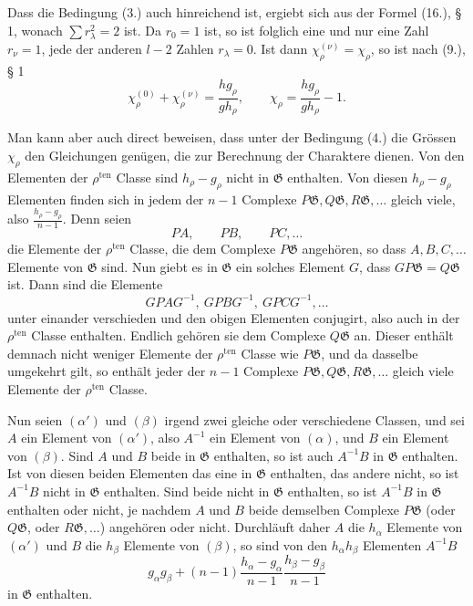 \documentclass[11pt]{article}
\newcommand{\Ggr}{\mathfrak{G}}
\begin{document}
Dass die Bedingung (3.) auch hinreichend ist, ergiebt sich aus der Formel (16.), § 1, wonach $\sum r_\lambda^2=2$ ist. Da $r_0=1$ ist, so ist folglich eine und nur eine Zahl $r_\nu=1$, jede der anderen $l-2$ Zahlen $r_\lambda=0$. Ist dann $\chi_\rho^{(\nu)}=\chi_\rho$, so ist nach (9.), § 1
\[
  \chi_\rho^{(0)}+\chi_\rho^{(\nu)}
  =
  \frac{h g_\rho}{g h_\rho},
  \qquad
  \chi_\rho=\frac{h g_\rho}{g h_\rho}-1.
\]

Man kann aber auch direct beweisen, dass unter der Bedingung (4.) die Grössen $\chi_\rho$ den Gleichungen genügen, die zur Berechnung der Charaktere dienen. Von den Elementen der $\rho^{\mathrm{ten}}$ Classe sind $h_\rho-g_\rho$ nicht in $\Ggr$ enthalten. Von diesen $h_\rho-g_\rho$ Elementen finden sich in jedem der $n-1$ Complexe $P\Ggr,Q\Ggr,R\Ggr,\ldots$ gleich viele, also $\frac{h_\rho-g_\rho}{n-1}$. Denn seien
\[
  PA,\qquad PB,\qquad PC,\ldots
\]
die Elemente der $\rho^{\mathrm{ten}}$ Classe, die dem Complexe $P\Ggr$ angehören, so dass $A,B,C,\ldots$ Elemente von $\Ggr$ sind. Nun giebt es in $\Ggr$ ein solches Element $G$, dass $GP\Ggr=Q\Ggr$ ist. Dann sind die Elemente
\[
  GPAG^{-1},\ GPBG^{-1},\ GPCG^{-1},\ldots
\]
unter einander verschieden und den obigen Elementen conjugirt, also auch in der $\rho^{\mathrm{ten}}$ Classe enthalten. Endlich gehören sie dem Complexe $Q\Ggr$ an. Dieser enthält demnach nicht weniger Elemente der $\rho^{\mathrm{ten}}$ Classe wie $P\Ggr$, und da dasselbe umgekehrt gilt, so enthält jeder der $n-1$ Complexe $P\Ggr,Q\Ggr,R\Ggr,\ldots$ gleich viele Elemente der $\rho^{\mathrm{ten}}$ Classe.

Nun seien $(\alpha')$ und $(\beta)$ irgend zwei gleiche oder verschiedene Classen, und sei $A$ ein Element von $(\alpha')$, also $A^{-1}$ ein Element von $(\alpha)$, und $B$ ein Element von $(\beta)$. Sind $A$ und $B$ beide in $\Ggr$ enthalten, so ist auch $A^{-1}B$ in $\Ggr$ enthalten. Ist von diesen beiden Elementen das eine in $\Ggr$ enthalten, das andere nicht, so ist $A^{-1}B$ nicht in $\Ggr$ enthalten. Sind beide nicht in $\Ggr$ enthalten, so ist $A^{-1}B$ in $\Ggr$ enthalten oder nicht, je nachdem $A$ und $B$ beide demselben Complexe $P\Ggr$ (oder $Q\Ggr$, oder $R\Ggr,\ldots$) angehören oder nicht. Durchläuft daher $A$ die $h_\alpha$ Elemente von $(\alpha')$ und $B$ die $h_\beta$ Elemente von $(\beta)$, so sind von den $h_\alpha h_\beta$ Elementen $A^{-1}B$
\[
  g_\alpha g_\beta+(n-1)\frac{h_\alpha-g_\alpha}{n-1}\frac{h_\beta-g_\beta}{n-1}
\]
in $\Ggr$ enthalten.
\end{document}
